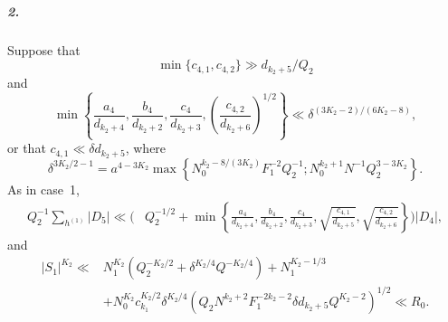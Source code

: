 \documentclass[10pt]{article}
\begin{document}
\subparagraph{2.}
Suppose that
\[
  \min\{c_{4,1},c_{4,2}\}\gg d_{k_2+5}/Q_2
\]
and
\[
  \min\left\{
    \frac{a_4}{d_{k_2+4}},\frac{b_4}{d_{k_2+2}},
    \frac{c_4}{d_{k_2+3}},
    \left(\frac{c_{4,2}}{d_{k_2+6}}\right)^{1/2}
  \right\}
  \ll\delta^{(3K_2-2)/(6K_2-8)},
\]
or that $c_{4,1}\ll\delta d_{k_2+5}$, where
\[
  \delta^{3K_2/2-1}
  =a^{4-3K_2}\max\left\{
    N_0^{k_2-8/(3K_2)}F_1^{-2}Q_2^{-1};
    N_0^{k_2+1}N^{-1}Q_2^{3-3K_2}
  \right\}.
\]
As in case~1,
\[
\begin{aligned}
  Q_2^{-1}\sum_{h^{(1)}}|D_5|
  \ll\Bigg(&Q_2^{-1/2}
  +\min\left\{
    \frac{a_4}{d_{k_2+4}},\frac{b_4}{d_{k_2+2}},
    \frac{c_4}{d_{k_2+3}},
    \sqrt{\frac{c_{4,1}}{d_{k_2+5}}},
    \sqrt{\frac{c_{4,2}}{d_{k_2+6}}}
  \right\}\Bigg)|D_4|,
\end{aligned}
\]
and
\[
\begin{aligned}
  |S_1|^{K_2}
  \ll{}&N_1^{K_2}\left(Q_2^{-K_2/2}+\delta^{K_2/4}Q^{-K_2/4}\right)
  +N_1^{K_2-1/3}\\
  &+N_0^{K_2}c_{k_1}^{K_2/2}\delta^{K_2/4}
  \left(Q_2N^{k_2+2}F_1^{-2k_2-2}\delta d_{k_2+5}Q^{K_2-2}\right)^{1/2}
  \ll R_0.
\end{aligned}
\]
\end{document}
